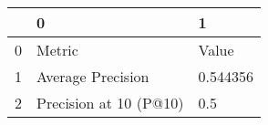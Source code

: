 \begin{tabular}{lll}
\toprule
{} &                       0 &         1 \\
\midrule
0 &                  Metric &     Value \\
1 &       Average Precision &  0.544356 \\
2 &  Precision at 10 (P@10) &       0.5 \\
\bottomrule
\end{tabular}
